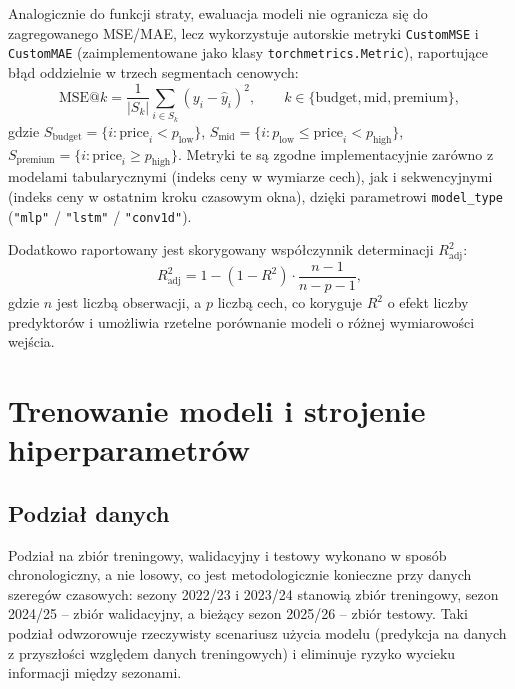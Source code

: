 \documentclass[a4paper,twoside,11pt]{mwrep}
\theoremstyle{plain} \newtheorem{thm}{Twierdzenie}
\theoremstyle{plain} \newtheorem{lem}{Lemat}
\theoremstyle{definition} \newtheorem{defn}{Definicja}
\theoremstyle{remark} \newtheorem*{rem}{Wniosek}
\begin{document}
Analogicznie do funkcji straty, ewaluacja modeli nie ogranicza się do
zagregowanego MSE/MAE, lecz wykorzystuje autorskie metryki
\texttt{CustomMSE} i \texttt{CustomMAE} (zaimplementowane jako klasy
\texttt{torchmetrics.Metric}), raportujące błąd oddzielnie w trzech
segmentach cenowych:
\begin{equation}
    \text{MSE@}k = \frac{1}{|S_k|}\sum_{i \in S_k} (y_i-\hat{y}_i)^2, \qquad k \in \{\text{budget}, \text{mid}, \text{premium}\},
\end{equation}
gdzie $S_{\text{budget}} = \{i: \text{price}_i < p_{\text{low}}\}$,
$S_{\text{mid}} = \{i: p_{\text{low}} \leq \text{price}_i < p_{\text{high}}\}$,
$S_{\text{premium}} = \{i: \text{price}_i \geq p_{\text{high}}\}$.
Metryki te są zgodne implementacyjnie zarówno z modelami tabularycznymi
(indeks ceny w wymiarze cech), jak i sekwencyjnymi (indeks ceny w
ostatnim kroku czasowym okna), dzięki parametrowi \texttt{model\_type}
(\texttt{"mlp"} / \texttt{"lstm"} / \texttt{"conv1d"}).

Dodatkowo raportowany jest skorygowany współczynnik determinacji
$R^2_{\text{adj}}$:
\begin{equation}
    R^2_{\text{adj}} = 1 - (1-R^2)\cdot\frac{n-1}{n-p-1},
\end{equation}
gdzie $n$ jest liczbą obserwacji, a $p$ liczbą cech, co koryguje $R^2$ o
efekt liczby predyktorów i umożliwia rzetelne porównanie modeli o różnej
wymiarowości wejścia.

\chapter{Trenowanie modeli i strojenie hiperparametrów}\label{ch:training}

\section{Podział danych}

Podział na zbiór treningowy, walidacyjny i testowy wykonano w sposób
chronologiczny, a nie losowy, co jest metodologicznie konieczne przy
danych szeregów czasowych: sezony 2022/23 i 2023/24 stanowią zbiór
treningowy, sezon 2024/25 -- zbiór walidacyjny, a bieżący sezon 2025/26 --
zbiór testowy. Taki podział odwzorowuje rzeczywisty scenariusz użycia
modelu (predykcja na danych z przyszłości względem danych treningowych) i
eliminuje ryzyko wycieku informacji między sezonami.
\end{document}
